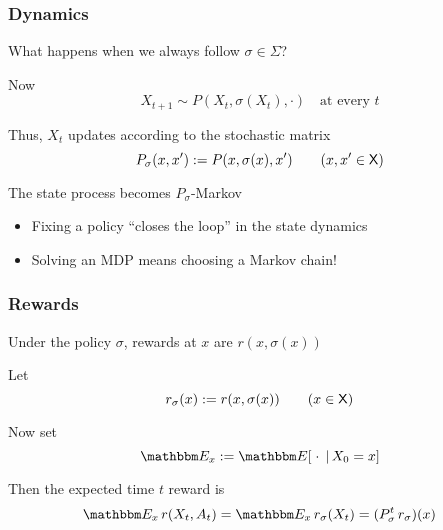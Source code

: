 \begin{frame}
    \frametitle{Dynamics}

    What happens when we always follow $\sigma \in \Sigma$?
    
    \vspace{0.5em}
    Now 
    \begin{equation*}
        X_{t+1} \sim P(X_t, \sigma(X_t), \cdot)
        \quad \text{at every $t$}
    \end{equation*}

    \vspace{0.5em}
    Thus, $X_t$ updates according to the stochastic matrix 
    \begin{equation*}
        P_\sigma(x, x') := P(x, \sigma(x), x')
        \qquad (x, x' \in \mathsf X)
    \end{equation*}

    \vspace{0.5em}
    The state process becomes $P_\sigma$-Markov

    \begin{itemize}
        \item Fixing a policy ``closes the loop'' in the state dynamics
        \vspace{0.5em}
        \item Solving an MDP means choosing a Markov chain!
    \end{itemize}

\end{frame}


\begin{frame}
    \frametitle{Rewards}
    
    Under the policy $\sigma$, rewards at $x$ are $r(x, \sigma(x))$  

    \vspace{0.5em}
    Let
    \begin{equation*}
        r_\sigma(x) := r(x, \sigma(x))
        \qquad (x \in \mathsf X)
    \end{equation*}

    \vspace{0.5em}
    Now set 
    $$\EE_x := \EE[ \; \cdot \; \given X_0 = x]$$

    \vspace{0.5em}
    Then the expected time $t$ reward is
    \begin{equation*}
        \EE_x  \, r(X_t, A_t) 
        = \EE_x  \, r_\sigma(X_t)  
        = (P_\sigma^t \, r_\sigma) (x)
    \end{equation*}

\end{frame}



